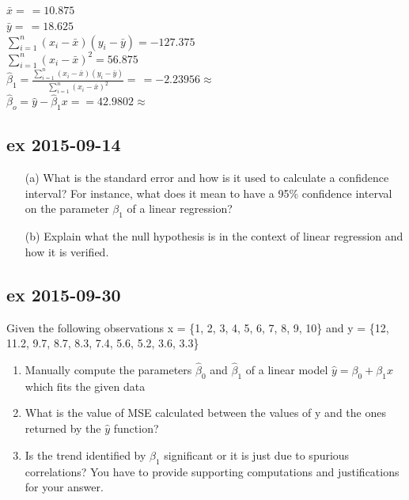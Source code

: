 \documentclass[a4paper,12pt,titlepage]{article} %
\begin{document}
$\bar{x} = \frac{}{} = 10.875 $ \\

$\bar{y} = \frac{}{} = 18.625 $ \\

$ \sum_{i=1}^{n} (x_{i}-\bar{x}) (y_{i}-\bar{y}) = -127.375 $ \\

$ \sum_{i=1}^{n} (x_{i}-\bar{x})^{2} = 56.875 $ \\

$ \hat{\beta}_{1} = \frac{\sum_{i=1}^{n} (x_{i}-\bar{x}) (y_{i}-\bar{y})}{ \sum_{i=1}^{n} (x_{i}-\bar{x})^{2} } = \frac{}{} = -2.23956 \approx  $ \\

$ \hat{\beta}_{o} = \hat{y} - \hat{\beta}_{1} x =  = 42.9802 \approx  $ \\

\subsection{ex 2015-09-14}
\begin{itemize}
\item[(a)] What is the standard error and how is it used to calculate a confidence interval? For instance, what does it mean to have a 95\% confidence interval on the parameter $ \beta_{1} $ of a linear regression?
\item[(b)] Explain what the null hypothesis is in the context of linear regression and how it is
verified.
\end{itemize}

\subsection{ex 2015-09-30}
Given the following observations x = \{1, 2, 3, 4, 5, 6, 7, 8, 9, 10\} and y = \{12, 11.2, 9.7, 8.7, 8.3, 7.4, 5.6, 5.2, 3.6, 3.3\}
\begin{enumerate}
\item Manually compute the parameters $ \hat{\beta}_{0} $ and $ \hat{\beta}_{1} $ of a linear model $ \hat{y} = \beta_{0} + \beta_{1} x $ which fits the given data
\item What is the value of MSE calculated between the values of y and the ones returned by the $ \hat{y} $ function?
\item Is the trend identified by $ \hat{\beta}_{1} $ significant or it is just due to spurious correlations? You have to provide supporting computations and justifications for your answer. 
\end{enumerate}
\end{document}
